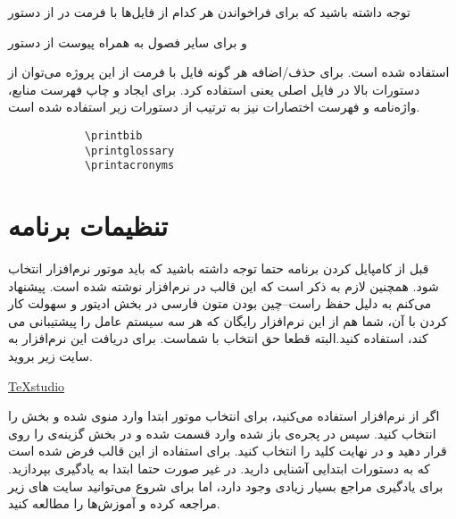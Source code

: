 توجه داشته باشید که برای فراخواندن هر کدام از فایل‌ها با فرمت 
در 
از دستور 
\begin{latin} 
\noindent\verb*||
\end{latin}
و برای سایر فصول به همراه پیوست از دستور 
\begin{latin} 
\noindent\verb*||
\end{latin}
استفاده شده است. برای حذف/اضافه هر گونه فایل با فرمت 
از این پروژه می‌توان از دستورات بالا در فایل اصلی یعنی 
استفاده کرد.  برای ایجاد و چاپ فهرست منابع، واژه‌نامه و فهرست اختصارات نیز به ترتیب از دستورات زیر استفاده شده است. 
\begin{flushleft}
	\begin{latin} 
		\begin{verbatim}
			\printbib
			\printglossary
			\printacronyms
		\end{verbatim}
	\end{latin}
\end{flushleft}



\section{تنظیمات برنامه}
قبل از کامپایل کردن برنامه حتما توجه داشته باشید که باید موتور نرم‌‌افزار
انتخاب شود. همچنین لازم به ذکر است که این قالب در نرم‌افزار 
نوشته شده است. پیشنهاد می‌کنم به دلیل حفظ راست--چین بودن متون فارسی در بخش ادیتور و سهولت کار کردن با آن، شما هم از این نرم‌افزار رایگان که هر سه سیستم عامل 
را پیشتیبانی می کند، استفاده کنید.البته قطعا حق انتخاب با شماست.  برای دریافت این نرم‌افزار به سایت زیر بروید. 
\begin{latin}
	\noindent
	\href{https://www.texstudio.org/}{TeXstudio}
\end{latin}
اگر از  نرم‌افزار
 استفاده می‌کنید، برای انتخاب موتور 
ابتدا وارد منوی 
شده و بخش 
را انتخاب کنید. سپس در پجره‌ی باز شده وارد قسمت 
شده و در بخش 
گزینه‌ی
را روی 
قرار دهید و در نهایت کلید 
را انتخاب کنید. برای استفاده از این قالب فرض شده است که به دستورات ابتدایی
\lr{\LaTeX}
آشنایی دارید. در غیر صورت حتما ابتدا به یادگیری 
\lr{\LaTeX}
بپردازید. برای یادگیری 
\lr{\LaTeX}
مراجع بسیار زیادی وجود دارد، اما برای شروع می‌توانید سایت های زیر مراجعه کرده و آموزش‌ها را مطالعه کنید. 

